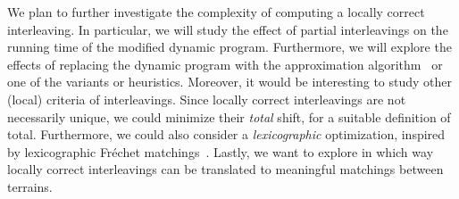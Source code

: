 \documentclass[a4paper,UKenglish, autoref, thm-restate, cleveref]{lipics-v2021}
\begin{document}
We plan to further investigate the complexity of computing a locally correct interleaving.
In particular, we will study the effect of partial interleavings on the running time of the modified dynamic program.
Furthermore, we will explore the effects of replacing the dynamic program with the approximation algorithm~\cite{agarwal2018computing} or one of the variants or heuristics.
Moreover, it would be interesting to study other (local) criteria of interleavings.
Since locally correct interleavings are not necessarily unique, we could minimize their \emph{total} shift, for a suitable definition of total.
Furthermore, we could also consider a \emph{lexicographic} optimization, inspired by lexicographic Fréchet matchings~\cite{rote2014lexicographic}.
Lastly, we want to explore in which way locally correct interleavings can be translated to meaningful matchings between terrains.


\end{document}
